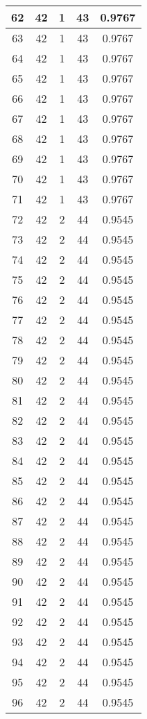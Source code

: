 \documentclass[letterpaper, 12pt]{article}
\begin{document}
\begin{longtable}{|c|c|c|c|c|}
\hline
62 & 42 & 1 & 43 & 0.9767 \\
\hline
63 & 42 & 1 & 43 & 0.9767 \\
\hline
64 & 42 & 1 & 43 & 0.9767 \\
\hline
65 & 42 & 1 & 43 & 0.9767 \\
\hline
66 & 42 & 1 & 43 & 0.9767 \\
\hline
67 & 42 & 1 & 43 & 0.9767 \\
\hline
68 & 42 & 1 & 43 & 0.9767 \\
\hline
69 & 42 & 1 & 43 & 0.9767 \\
\hline
70 & 42 & 1 & 43 & 0.9767 \\
\hline
71 & 42 & 1 & 43 & 0.9767 \\
\hline
72 & 42 & 2 & 44 & 0.9545 \\
\hline
73 & 42 & 2 & 44 & 0.9545 \\
\hline
74 & 42 & 2 & 44 & 0.9545 \\
\hline
75 & 42 & 2 & 44 & 0.9545 \\
\hline
76 & 42 & 2 & 44 & 0.9545 \\
\hline
77 & 42 & 2 & 44 & 0.9545 \\
\hline
78 & 42 & 2 & 44 & 0.9545 \\
\hline
79 & 42 & 2 & 44 & 0.9545 \\
\hline
80 & 42 & 2 & 44 & 0.9545 \\
\hline
81 & 42 & 2 & 44 & 0.9545 \\
\hline
82 & 42 & 2 & 44 & 0.9545 \\
\hline
83 & 42 & 2 & 44 & 0.9545 \\
\hline
84 & 42 & 2 & 44 & 0.9545 \\
\hline
85 & 42 & 2 & 44 & 0.9545 \\
\hline
86 & 42 & 2 & 44 & 0.9545 \\
\hline
87 & 42 & 2 & 44 & 0.9545 \\
\hline
88 & 42 & 2 & 44 & 0.9545 \\
\hline
89 & 42 & 2 & 44 & 0.9545 \\
\hline
90 & 42 & 2 & 44 & 0.9545 \\
\hline
91 & 42 & 2 & 44 & 0.9545 \\
\hline
92 & 42 & 2 & 44 & 0.9545 \\
\hline
93 & 42 & 2 & 44 & 0.9545 \\
\hline
94 & 42 & 2 & 44 & 0.9545 \\
\hline
95 & 42 & 2 & 44 & 0.9545 \\
\hline
96 & 42 & 2 & 44 & 0.9545 \\

\end{longtable}
\end{document}
